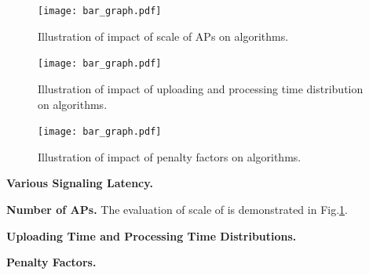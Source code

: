 \begin{figure}[hbt]                                                 %
    \centering                                                      %
    \texttt{[image: bar\_graph.pdf]}           %
    \caption{Illustration of impact of scale of APs on algorithms.}
    \label{fig:ss_scale}                                            %
\end{figure}                                                        %

\begin{figure}[hbt]                                                 %
    \centering                                                      %
    \texttt{[image: bar\_graph.pdf]}           %
    \caption{Illustration of impact of uploading and processing time distribution on algorithms.}
    \label{fig:ss_dist}                                             %
\end{figure}                                                        %

\begin{figure}[hbt]                                                 %
    \centering                                                      %
    \texttt{[image: bar\_graph.pdf]}           %
    \caption{Illustration of impact of penalty factors on algorithms.}
    \label{fig:ss_penalty}                                          %
\end{figure}                                                        %

\textbf{Various Signaling Latency.}

\textbf{Number of APs.} %
The evaluation of scale of is demonstrated in Fig.\ref{fig:ss_scale}.

\textbf{Uploading Time and Processing Time Distributions.}

\textbf{Penalty Factors.}

